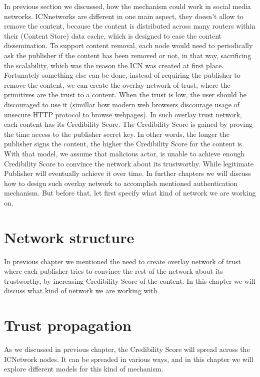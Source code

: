 \documentclass[nostrict]{szablonPG}
\begin{document}
In previous section we discussed, how the mechanism could work in social media networks. ICNnetworks are different in one main aspect, they doesn't allow to remove the content, because the content is distributed across many routers within their (Content Store) data cache, which is designed to ease the content dissemination. To support content removal, each node would need to periodically ask the publisher if the content has been removed or not, in that way, sacrificing the scalability, which was the reason the ICN was created at first place. 
Fortunately something else can be done, instead of requiring the publisher to remove the content, we can create the overlay network of trust, where the primitives are the trust to a content. When the trust is low, the user should be discouraged to use it (simillar how modern web browsers discourage usage of unsecure HTTP protocol to browse webpages). In such overlay trust network, each content has its Credibility Score. The Credibility Score is gained by proving the time access to the publisher secret key. In other words, the longer the publisher signs the content, the higher the Credibility Score for the content is. With that model, we assume that malicious actor, is unable to achieve enough Credibility Score to convince the network about its trustworthy. While legitimate Publisher will eventually achieve it over time. In further chapters we will discuss how to design such overlay network to accomplish mentioned authentication mechanism. But before that, let first specify what kind of network we are working on.

\section{Network structure}
In previous chapter we mentioned the need to create overlay network of trust where each publisher tries to convince the rest of the network about its trustworthy, by increasing Credibility Score of the content. In this chapter we will discuss what kind of network we are working with. 

\section{Trust propagation}


As we discussed in previous chapter, the Credibility Score will spread across the ICNetwork nodes. It can be spreaded in various ways, and in this chapter we will explore different models for this kind of mechanism. 
\end{document}
